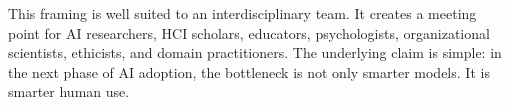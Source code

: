 \documentclass[10pt]{article}
\begin{document}
This framing is well suited to an interdisciplinary team. It creates a meeting point for AI researchers, HCI scholars, educators, psychologists, organizational scientists, ethicists, and domain practitioners. The underlying claim is simple: in the next phase of AI adoption, the bottleneck is not only smarter models. It is smarter human use.



\end{document}
